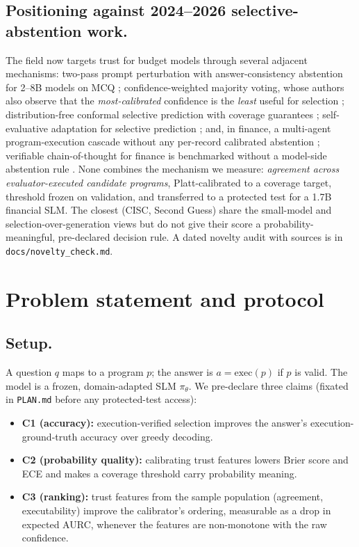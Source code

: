 \documentclass[conference]{IEEEtran}
\begin{document}
\subsection{Positioning against 2024--2026 selective-abstention work.}
The field now targets trust for budget models through several adjacent mechanisms: two-pass
prompt perturbation with answer-consistency abstention for 2--8B models on MCQ
\citep{secondguess2025}; confidence-weighted majority voting, whose authors also observe that
the \emph{most-calibrated} confidence is the \emph{least} useful for selection
\citep{cisc2025}; distribution-free conformal selective prediction with coverage guarantees
\citep{sconu2025,lec2025}; self-evaluative adaptation for selective prediction
\citep{aspire2023}; and, in finance, a multi-agent program-execution cascade without any
per-record calibrated abstention \citep{finman2025}; verifiable chain-of-thought for
finance is benchmarked without a model-side abstention rule \citep{finchain2025}. None combines the mechanism we
measure: \emph{agreement across evaluator-executed candidate programs}, Platt-calibrated to a
coverage target, threshold frozen on validation, and transferred to a protected test for a
1.7B financial SLM. The closest (CISC, Second Guess) share the small-model and
selection-over-generation views but do not give their score a probability-meaningful,
pre-declared decision rule. A dated novelty audit with sources is in \texttt{docs/novelty\_check.md}.

\section{Problem statement and protocol}
\subsection{Setup.} A question $q$ maps to a program $p$; the answer is $a=\text{exec}(p)$
if $p$ is valid. The model is a frozen, domain-adapted SLM $\pi_{\theta}$. We pre-declare
three claims (fixated in \texttt{PLAN.md} before any protected-test access):
\begin{itemize}[nosep,leftmargin=1.2em]
\item \textbf{C1 (accuracy):} execution-verified selection improves the answer's
execution-ground-truth accuracy over greedy decoding.
\item \textbf{C2 (probability quality):} calibrating trust features lowers Brier score and
ECE and makes a coverage threshold carry probability meaning.
\item \textbf{C3 (ranking):} trust features from the sample population (agreement,
executability) improve the calibrator's ordering, measurable as a drop in expected AURC,
whenever the features are non-monotone with the raw confidence.
\end{itemize}
\end{document}
